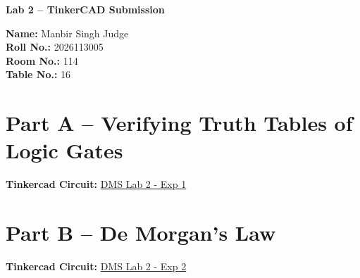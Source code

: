 \documentclass[12pt]{article}
\begin{document}
\begin{center}
    {\Large \textbf{Lab 2 -- TinkerCAD Submission}}
\end{center}

\vspace{1em}

\noindent
\textbf{Name:} Manbir Singh Judge \\[0.5em]
\textbf{Roll No.:} 2026113005 \\[0.5em]
\textbf{Room No.:} 114 \\[0.5em]
\textbf{Table No.:} 16

\vspace{2em}

\section*{Part A -- Verifying Truth Tables of Logic Gates}

\noindent
\textbf{Tinkercad Circuit:}
\href{https://www.tinkercad.com/things/kATGKwCnRwN-dms-lab-2-exp-1?sharecode=7HgT0J6fQ6QNoWgAy2pFz0Ol8pav9oxKmdrKJmCbqXE}{DMS Lab 2 - Exp 1}

\vspace{2em}

\section*{Part B -- De Morgan's Law}

\noindent
\textbf{Tinkercad Circuit:}
\href{https://www.tinkercad.com/things/lKgbpBDrOE0-dms-lab-2-exp-2?sharecode=7S5MEHwnXGBaEBTygyPoW4ldG7CQEkxFdRFCpr8eibA}{DMS Lab 2 - Exp 2}
\end{document}
